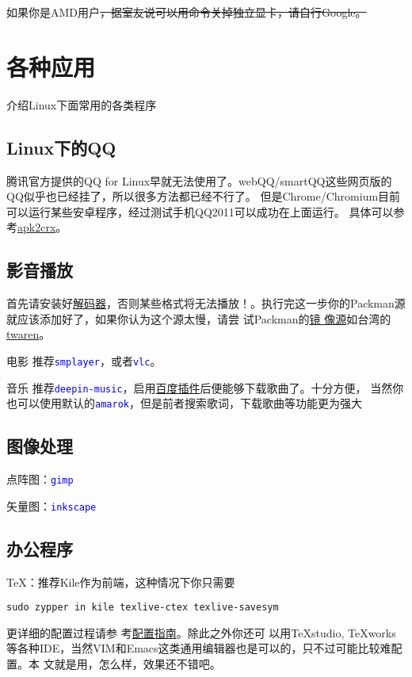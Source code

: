 \documentclass[10pt,openany]{book}
\newcommand{\soft}[1]{\texttt{\textcolor{blue}{#1}}}
\begin{document}
如果你是AMD用户\sout{，据室友说可以用命令关掉独立显卡，请自行Google。}
\chapter{各种应用}
介绍Linux下面常用的各类程序
\section{Linux下的QQ}
腾讯官方提供的QQ for Linux早就无法使用了。webQQ/smartQQ这些网页版的QQ似乎也已经挂了，所以很多方法都已经不行了。
但是Chrome/Chromium目前可以运行某些安卓程序，经过测试手机QQ2011可以成功在上面运行。
具体可以参考\href{http://huodong.ustc.edu.cn/Crx}{apk2crx}。
\section{影音播放}
{\color{orange}首先请安装好\href{https://lug.ustc.edu.cn/sites/opensuse-guide/codecs.php}{解码器}，否则某些格式将无法播放！}。执行完这一步你的Packman源
就应该添加好了，如果你认为这个源太慢，请尝
试Packman的\href{http://packman.links2linux.org/mirrors}{镜%
像源}如台湾的\href{http://ftp.twaren.net/Linux/Packman/}{twaren}。
\begin{compactdesc}
 \item[电影] 推荐\soft{smplayer}，或者\soft{vlc}。
 \item[音乐] 推荐\soft{deepin-music}，启用\href{https://forum.suse.org.cn/viewtopic.php?f=7&t=2530}{百度插件}后便能够下载歌曲了。十分方便，
当然你也可以使用默认的\soft{amarok}，但是前者搜索歌词，下载歌曲等功能更为强大
\end{compactdesc}
\section{图像处理}
点阵图：\soft{gimp}

矢量图：\soft{inkscape}
\section{办公程序}
\TeX ：推荐Kile作为前端，这种情况下你只需要
\begin{Verbatim}[formatcom=\color{codecolor}]
    sudo zypper in kile texlive-ctex texlive-savesym
\end{Verbatim}
更详细的配置过程请参
考\href{https://forum.suse.org.cn/viewtopic.php?f=6&t=2392&p=18750}{配置指南}。除此之外你还可
以用\TeX studio, \TeX works等各种IDE，当然VIM和Emacs这类通用编辑器也是可以的，只不过可能比较难配置。本
文就是用，怎么样，效果还不错吧。
\end{document}
